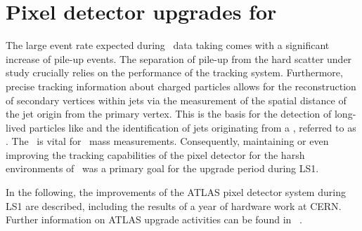 \chapter{Pixel detector upgrades for \RunTwo}
\label{chap:trackingupgrades}
%
The large event rate expected during \RunTwo\ data taking comes with a significant increase of pile-up events. The separation of pile-up from the hard scatter under study crucially relies on the performance of the tracking system. Furthermore, precise tracking information about charged particles allows for the reconstruction of secondary vertices within jets via the measurement of the spatial distance of the jet origin from the primary vertex. This is the basis for the detection of long-lived particles like  and the identification of jets originating from a \bquark, referred to as \btag. The \btag\ is vital for \tquark\ mass measurements. Consequently, maintaining or even improving the tracking capabilities of the pixel detector for the harsh environments of \RunTwo\ was a primary goal for the upgrade period during \gls{LS1}.

In the following, the improvements of the \gls{ATLAS} pixel detector system during \gls{LS1} are described, including the results of a year of hardware work at \gls{CERN}. Further information on \gls{ATLAS} upgrade activities can be found in ~\cite{CERN-LHCC-2011-012}.







